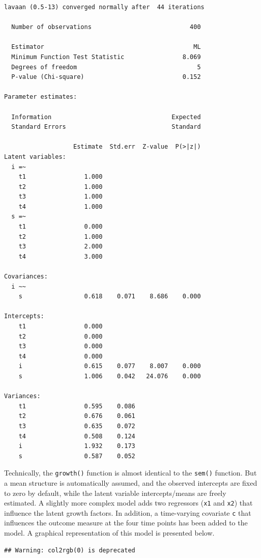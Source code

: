 \begin{verbatim}
lavaan (0.5-13) converged normally after  44 iterations

  Number of observations                           400

  Estimator                                         ML
  Minimum Function Test Statistic                8.069
  Degrees of freedom                                 5
  P-value (Chi-square)                           0.152

Parameter estimates:

  Information                                 Expected
  Standard Errors                             Standard

                   Estimate  Std.err  Z-value  P(>|z|)
Latent variables:
  i =~
    t1                1.000
    t2                1.000
    t3                1.000
    t4                1.000
  s =~
    t1                0.000
    t2                1.000
    t3                2.000
    t4                3.000

Covariances:
  i ~~
    s                 0.618    0.071    8.686    0.000

Intercepts:
    t1                0.000
    t2                0.000
    t3                0.000
    t4                0.000
    i                 0.615    0.077    8.007    0.000
    s                 1.006    0.042   24.076    0.000

Variances:
    t1                0.595    0.086
    t2                0.676    0.061
    t3                0.635    0.072
    t4                0.508    0.124
    i                 1.932    0.173
    s                 0.587    0.052
\end{verbatim}

Technically, the \texttt{growth()} function is almost identical to the
\texttt{sem()} function. But a mean structure is automatically assumed,
and the observed intercepts are fixed to zero by default, while the
latent variable intercepts/means are freely estimated. A slightly more
complex model adds two regressors (\texttt{x1} and \texttt{x2}) that
influence the latent growth factors. In addition, a time-varying
covariate \texttt{c} that influences the outcome measure at the four
time points has been added to the model. A graphical representation of
this model is presented below.

\begin{verbatim}
## Warning: col2rgb(0) is deprecated
\end{verbatim}

